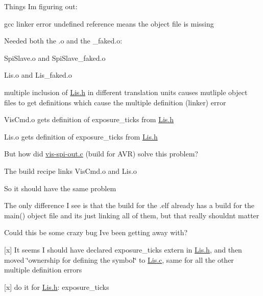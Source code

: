 Things I\textquotesingle{}m figuring out\+:


\begin{DoxyItemize}
\item gcc linker error {\ttfamily undefined reference} means the object file is missing
\item Needed both the .o and the {\ttfamily \+\_\+faked.\+o}\+:
\begin{DoxyItemize}
\item Spi\+Slave.\+o and {\ttfamily Spi\+Slave\+\_\+faked.\+o}
\item Lis.\+o and {\ttfamily Lis\+\_\+faked.\+o}
\end{DoxyItemize}
\item multiple inclusion of \mbox{\hyperlink{Lis_8h}{Lis.\+h}} in different translation units causes mutliple object files to get definitions which cause the multiple definition (linker) error
\begin{DoxyItemize}
\item Vis\+Cmd.\+o gets definition of {\ttfamily exposure\+\_\+ticks} from \mbox{\hyperlink{Lis_8h}{Lis.\+h}}
\item Lis.\+o gets definition of {\ttfamily exposure\+\_\+ticks} from \mbox{\hyperlink{Lis_8h}{Lis.\+h}}
\end{DoxyItemize}
\item But how did \mbox{\hyperlink{vis-spi-out_8c}{vis-\/spi-\/out.\+c}} (build for AVR) solve this problem?
\begin{DoxyItemize}
\item The build recipe links Vis\+Cmd.\+o and Lis.\+o
\item So it should have the same problem
\item The only difference I see is that the build for the .elf already has a build for the main() object file and it\textquotesingle{}s just linking all of them, but that really shouldn\textquotesingle{}t matter
\item Could this be some crazy bug I\textquotesingle{}ve been getting away with?
\item \mbox{[}x\mbox{]} It seems I should have declared {\ttfamily exposure\+\_\+ticks} extern in \mbox{\hyperlink{Lis_8h}{Lis.\+h}}, and then moved \char`\"{}ownership for defining the symbol\char`\"{} to \mbox{\hyperlink{Lis_8c_source}{Lis.\+c}}, same for all the other multiple definition errors
\begin{DoxyItemize}
\item \mbox{[}x\mbox{]} do it for \mbox{\hyperlink{Lis_8h}{Lis.\+h}}\+: {\ttfamily exposure\+\_\+ticks}

\end{DoxyItemize}
\end{DoxyItemize}
\end{DoxyItemize}
